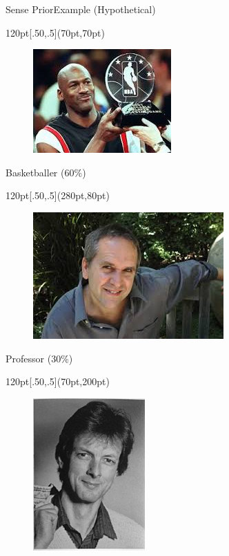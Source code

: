 \begin{frame}{Sense Prior}{Example (Hypothetical)}
  \begin{textblock*}{120pt}[.50,.5](70pt,70pt)
  \begin{figure}[h]
 
 \includegraphics[bb=0 0 200 150, scale=0.4]{./baske.jpg}
 
\end{figure}
   \centering 
   Basketballer (60\%)
\end{textblock*}
  \begin{textblock*}{120pt}[.50,.5](280pt,80pt)
  \begin{figure}[h]
 \includegraphics[bb=0 0 200 150, scale=0.4]{./prof.jpg}
\end{figure}
\centering
   Professor (30\%)
\end{textblock*}
  \begin{textblock*}{120pt}[.50,.5](70pt,200pt)
  \begin{figure}[h]
 \includegraphics[bb=0 0 200 150, scale=0.4]{./botanist.jpg}

\end{figure}
\end{textblock*}
\end{frame}
